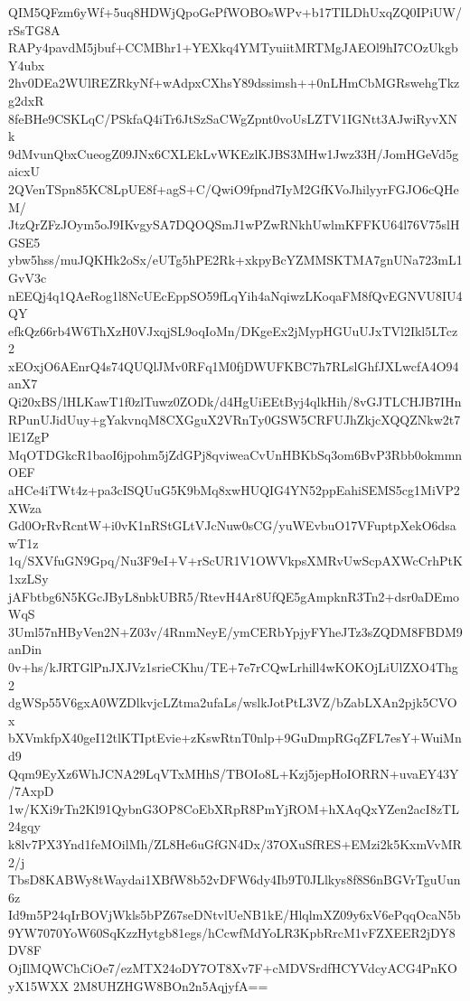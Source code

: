 QIM5QFzm6yWf+5uq8HDWjQpoGePfWOBOsWPv+b17TILDhUxqZQ0IPiUW/rSsTG8A
RAPy4pavdM5jbuf+CCMBhr1+YEXkq4YMTyuiitMRTMgJAEOl9hI7COzUkgbY4ubx
2hv0DEa2WUlREZRkyNf+wAdpxCXhsY89dssimsh++0nLHmCbMGRswehgTkzg2dxR
8feBHe9CSKLqC/PSkfaQ4iTr6JtSzSaCWgZpnt0voUsLZTV1IGNtt3AJwiRyvXNk
9dMvunQbxCueogZ09JNx6CXLEkLvWKEzlKJBS3MHw1Jwz33H/JomHGeVd5gaicxU
2QVenTSpn85KC8LpUE8f+agS+C/QwiO9fpnd7IyM2GfKVoJhilyyrFGJO6cQHeM/
JtzQrZFzJOym5oJ9IKvgySA7DQOQSmJ1wPZwRNkhUwlmKFFKU64l76V75slHGSE5
ybw5hss/muJQKHk2oSx/eUTg5hPE2Rk+xkpyBcYZMMSKTMA7gnUNa723mL1GvV3c
nEEQj4q1QAeRog1l8NcUEcEppSO59fLqYih4aNqiwzLKoqaFM8fQvEGNVU8IU4QY
efkQz66rb4W6ThXzH0VJxqjSL9oqIoMn/DKgeEx2jMypHGUuUJxTVl2Ikl5LTcz2
xEOxjO6AEnrQ4s74QUQlJMv0RFq1M0fjDWUFKBC7h7RLslGhfJXLwcfA4O94anX7
Qi20xBS/lHLKawT1f0zlTuwz0ZODk/d4HgUiEEtByj4qlkHih/8vGJTLCHJB7IHn
RPunUJidUuy+gYakvnqM8CXGguX2VRnTy0GSW5CRFUJhZkjcXQQZNkw2t7lE1ZgP
MqOTDGkcR1baoI6jpohm5jZdGPj8qviweaCvUnHBKbSq3om6BvP3Rbb0okmmnOEF
aHCe4iTWt4z+pa3cISQUuG5K9bMq8xwHUQIG4YN52ppEahiSEMS5cg1MiVP2XWza
Gd0OrRvRcntW+i0vK1nRStGLtVJcNuw0sCG/yuWEvbuO17VFuptpXekO6dsawT1z
1q/SXVfuGN9Gpq/Nu3F9eI+V+rScUR1V1OWVkpsXMRvUwScpAXWcCrhPtK1xzLSy
jAFbtbg6N5KGcJByL8nbkUBR5/RtevH4Ar8UfQE5gAmpknR3Tn2+dsr0aDEmoWqS
3Uml57nHByVen2N+Z03v/4RnmNeyE/ymCERbYpjyFYheJTz3sZQDM8FBDM9anDin
0v+hs/kJRTGlPnJXJVz1srieCKhu/TE+7e7rCQwLrhill4wKOKOjLiUlZXO4Thg2
dgWSp55V6gxA0WZDlkvjcLZtma2ufaLs/wslkJotPtL3VZ/bZabLXAn2pjk5CVOx
bXVmkfpX40geI12tlKTIptEvie+zKswRtnT0nlp+9GuDmpRGqZFL7esY+WuiMnd9
Qqm9EyXz6WhJCNA29LqVTxMHhS/TBOIo8L+Kzj5jepHoIORRN+uvaEY43Y/7AxpD
1w/KXi9rTn2Kl91QybnG3OP8CoEbXRpR8PmYjROM+hXAqQxYZen2acI8zTL24gqy
k8lv7PX3Ynd1feMOilMh/ZL8He6uGfGN4Dx/37OXuSfRES+EMzi2k5KxmVvMR2/j
TbsD8KABWy8tWaydai1XBfW8b52vDFW6dy4Ib9T0JLlkys8f8S6nBGVrTguUun6z
Id9m5P24qIrBOVjWkls5bPZ67seDNtvlUeNB1kE/HlqlmXZ09y6xV6ePqqOcaN5b
9YW7070YoW60SqKzzHytgb81egs/hCcwfMdYoLR3KpbRrcM1vFZXEER2jDY8DV8F
OjIlMQWChCiOe7/ezMTX24oDY7OT8Xv7F+cMDVSrdfHCYVdcyACG4PnKOyX15WXX
2M8UHZHGW8BOn2n5AqjyfA==
